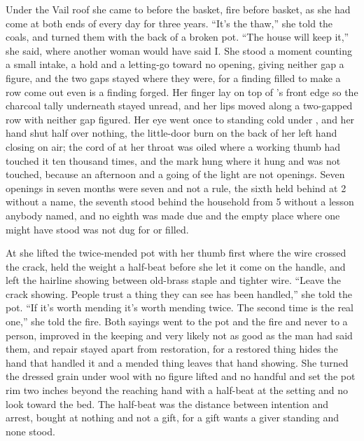 Under the Vail roof she came to  before the basket, fire before basket, as she had come at both ends of every day for three years. “It's the thaw,” she told the coals, and turned them with the back of a broken pot. “The house will keep it,” she said, where another woman would have said I. She stood a moment counting a small intake, a hold and a letting-go toward no opening, giving neither gap a figure, and the two gaps stayed where they were, for a finding filled to make a row come out even is a finding forged. Her finger lay on top of 's front edge so the charcoal tally underneath stayed unread, and her lips moved along a two-gapped row with neither gap figured. Her eye went once to  standing cold under , and her hand shut half over nothing, the little-door burn on the back of her left hand closing on air; the cord of  at her throat was oiled where a working thumb had touched it ten thousand times, and the mark hung where it hung and was not touched, because an afternoon and a going of the light are not openings. Seven openings in seven months were seven and not a rule, the sixth held behind at  2 without a name, the seventh stood behind the household from  5 without a lesson anybody named, and no eighth was made due and the empty place where one might have stood was not dug for or filled.

At  she lifted the twice-mended pot with her thumb first where the wire crossed the crack, held the weight a half-beat before she let it come on the handle, and left the hairline showing between old-brass staple and tighter wire. “Leave the crack showing. People trust a thing they can see has been handled,” she told the pot. “If it's worth mending it's worth mending twice. The second time is the real one,” she told the fire. Both sayings went to the pot and the fire and never to a person, improved in the keeping and very likely not as good as the man had said them, and repair stayed apart from restoration, for a restored thing hides the hand that handled it and a mended thing leaves that hand showing. She turned the dressed grain under wool with no figure lifted and no handful and set the pot rim two inches beyond the reaching hand with a half-beat at the setting and no look toward the bed. The half-beat was the distance between intention and arrest, bought at nothing and not a gift, for a gift wants a giver standing and none stood.

